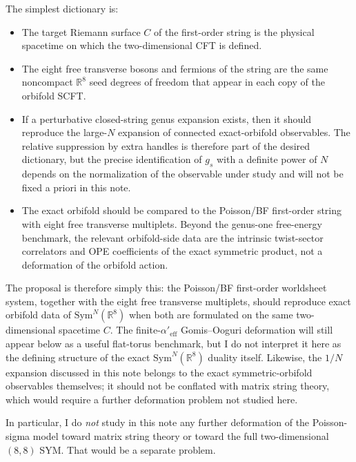 \documentclass[11pt]{article}
\newcommand{\Aeff}{\alpha'_{\mathrm{eff}}}
\newcommand{\Sym}{\mathrm{Sym}}
\newcommand{\bR}{\mathbb{R}}
\begin{document}
The simplest dictionary is:
\begin{itemize}
\item The target Riemann surface $C$ of the first-order string is the physical spacetime on which the two-dimensional CFT is defined.
\item The eight free transverse bosons and fermions of the string are the same noncompact $\bR^8$ seed degrees of freedom that appear in each copy of the orbifold SCFT.
\item If a perturbative closed-string genus expansion exists, then it should reproduce the large-$N$ expansion of connected exact-orbifold observables. The relative suppression by extra handles is therefore part of the desired dictionary, but the precise identification of $g_s$ with a definite power of $N$ depends on the normalization of the observable under study and will not be fixed a priori in this note.
\item The exact orbifold should be compared to the Poisson/BF first-order string with eight free transverse multiplets. Beyond the genus-one free-energy benchmark, the relevant orbifold-side data are the intrinsic twist-sector correlators and OPE coefficients of the exact symmetric product, not a deformation of the orbifold action.
\end{itemize}

The proposal is therefore simply this: the Poisson/BF first-order worldsheet system, together with the eight free transverse multiplets, should reproduce exact orbifold data of $\Sym^N(\bR^8)$ when both are formulated on the same two-dimensional spacetime $C$. The finite-$\Aeff$ Gomis--Ooguri deformation will still appear below as a useful flat-torus benchmark, but I do not interpret it here as the defining structure of the exact $\Sym^N(\bR^8)$ duality itself. Likewise, the $1/N$ expansion discussed in this note belongs to the exact symmetric-orbifold observables themselves; it should not be conflated with matrix string theory, which would require a further deformation problem not studied here.

In particular, I do \emph{not} study in this note any further deformation of the Poisson-sigma model toward matrix string theory or toward the full two-dimensional $(8,8)$ SYM. That would be a separate problem.
\end{document}
